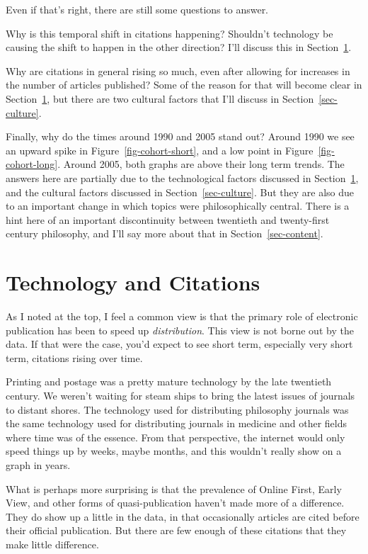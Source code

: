 \documentclass[
  12pt,
  letterpaper,
  DIV=11,
  numbers=noendperiod]{scrartcl}
\begin{document}
Even if that's right, there are still some questions to answer.

Why is this temporal shift in citations happening? Shouldn't technology
be causing the shift to happen in the other direction? I'll discuss this
in Section~\ref{sec-technology}.

Why are citations in general rising so much, even after allowing for
increases in the number of articles published? Some of the reason for
that will become clear in Section~\ref{sec-technology}, but there are
two cultural factors that I'll discuss in Section~\ref{sec-culture}.

Finally, why do the times around 1990 and 2005 stand out? Around 1990 we
see an upward spike in Figure~\ref{fig-cohort-short}, and a low point in
Figure~\ref{fig-cohort-long}. Around 2005, both graphs are above their
long term trends. The answers here are partially due to the
technological factors discussed in Section~\ref{sec-technology}, and the
cultural factors discussed in Section~\ref{sec-culture}. But they are
also due to an important change in which topics were philosophically
central. There is a hint here of an important discontinuity between
twentieth and twenty-first century philosophy, and I'll say more about
that in Section~\ref{sec-content}.

\section{Technology and Citations}\label{sec-technology}

As I noted at the top, I feel a common view is that the primary role of
electronic publication has been to speed up \emph{distribution}. This
view is not borne out by the data. If that were the case, you'd expect
to see short term, especially very short term, citations rising over
time.

Printing and postage was a pretty mature technology by the late
twentieth century. We weren't waiting for steam ships to bring the
latest issues of journals to distant shores. The technology used for
distributing philosophy journals was the same technology used for
distributing journals in medicine and other fields where time was of the
essence. From that perspective, the internet would only speed things up
by weeks, maybe months, and this wouldn't really show on a graph in
years.

What is perhaps more surprising is that the prevalence of Online First,
Early View, and other forms of quasi-publication haven't made more of a
difference. They do show up a little in the data, in that occasionally
articles are cited before their official publication. But there are few
enough of these citations that they make little difference.
\end{document}
